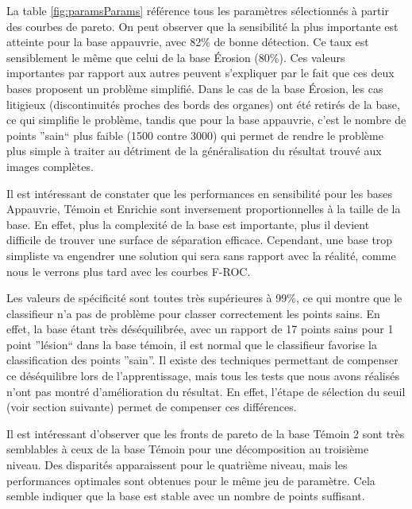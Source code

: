 La table \ref{fig:paramsParams} référence tous les paramètres sélectionnés à partir des courbes de pareto. On peut observer que la sensibilité la plus importante est atteinte pour la base appauvrie, avec 82\% de bonne détection. Ce taux est sensiblement le même que celui de la base Érosion (80\%). Ces valeurs importantes par rapport aux autres peuvent s'expliquer par le fait que ces deux bases proposent un problème simplifié. Dans le cas de la base Érosion, les cas litigieux (discontinuités proches des bords des organes) ont été retirés de la base, ce qui simplifie le problème, tandis que pour la base appauvrie, c'est le nombre de points ''sain`` plus faible (1500 contre 3000) qui permet de rendre le problème plus simple à traiter au détriment de la généralisation du résultat trouvé aux images complètes.

Il est intéressant de constater que les performances en sensibilité pour les bases Appauvrie, Témoin et Enrichie sont inversement proportionnelles à la taille de la base. En effet, plus la complexité de la base est importante, plus il devient difficile de trouver une surface de séparation efficace. Cependant, une base trop simpliste va engendrer une solution qui sera sans rapport avec la réalité, comme nous le verrons plus tard avec les courbes F-ROC.

Les valeurs de spécificité sont toutes très supérieures à 99\%, ce qui montre que le classifieur n'a pas de problème pour classer correctement les points sains. En effet, la base étant très déséquilibrée, avec un rapport de 17 points sains pour 1 point ''lésion`` dans la base témoin, il est normal que le classifieur favorise la classification des points ''sain''. Il existe des techniques permettant de compenser ce déséquilibre lors de l'apprentissage, mais tous les tests que nous avons réalisés n'ont pas montré d'amélioration du résultat. En effet, l'étape de sélection du seuil (voir section suivante) permet de compenser ces différences.

Il est intéressant d'observer que les fronts de pareto de la base Témoin 2 sont très semblables à ceux de la base Témoin pour une décomposition au troisième niveau. Des disparités apparaissent pour le quatrième niveau, mais les performances optimales sont obtenues pour le même jeu de paramètre. Cela semble indiquer que la base est stable avec un nombre de points suffisant.

